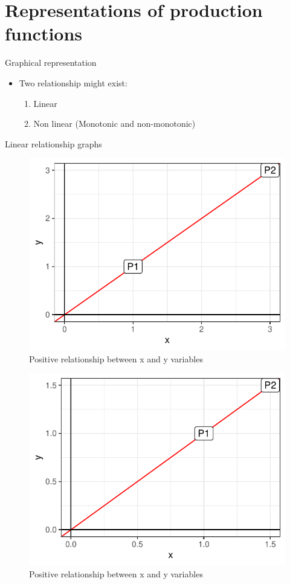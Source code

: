 \documentclass[12pt,ignorenonframetext,aspectratio=169]{beamer}
\providecommand{\tightlist}{%
  \setlength{\itemsep}{0pt}\setlength{\parskip}{0pt}}
\begin{document}
\hypertarget{representations-of-production-functions}{%
\section{Representations of production
functions}\label{representations-of-production-functions}}

\begin{frame}{Graphical representation}
\protect\hypertarget{graphical-representation}{}
\begin{itemize}
\tightlist
\item
  Two relationship might exist:

  \begin{enumerate}
  \tightlist
  \item
    Linear
  \item
    Non linear (Monotonic and non-monotonic)
  \end{enumerate}
\end{itemize}
\end{frame}

\begin{frame}{Linear relationship graphs}
\protect\hypertarget{linear-relationship-graphs}{}
\begin{figure}
\includegraphics[width=0.28\linewidth]{02-production_economics_files/figure-beamer/linear-relationship-positive-1} \caption{Positive relationship between x and y variables}\label{fig:linear-relationship-positive1}
\end{figure}
\begin{figure}
\includegraphics[width=0.28\linewidth]{02-production_economics_files/figure-beamer/linear-relationship-positive-2} \caption{Positive relationship between x and y variables}\label{fig:linear-relationship-positive2}
\end{figure}
\end{frame}
\end{document}

